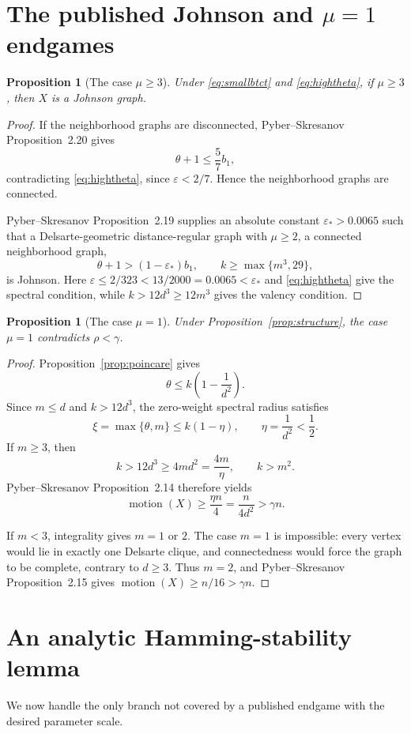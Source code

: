 \documentclass[11pt]{amsart}
\newtheorem{proposition}[theorem]{Proposition}
\theoremstyle{definition}
\newcommand{\mot}{\operatorname{motion}}
\newcommand{\eps}{\varepsilon}
\newcommand{\gam}{\gamma}
\begin{document}
\section{The published Johnson and $\mu=1$ endgames}
\begin{proposition}[The case $\mu\ge3$]\label{prop:mu3}
Under \eqref{eq:smallbtct} and \eqref{eq:hightheta}, if $\mu\ge3$, then $X$ is a Johnson graph.
\end{proposition}

\begin{proof}
If the neighborhood graphs are disconnected, Pyber--Skresanov Proposition~2.20 gives
\[
  \theta+1\le\frac57b_1,
\]
contradicting \eqref{eq:hightheta}, since $\eps<2/7$.  Hence the neighborhood graphs are connected.

Pyber--Skresanov Proposition~2.19 supplies an absolute constant $\eps_*>0.0065$ such that a Delsarte-geometric distance-regular graph with $\mu\ge2$, a connected neighborhood graph,
\[
  \theta+1>(1-\eps_*)b_1,
  \qquad
  k\ge\max\{m^3,29\},
\]
is Johnson.  Here $\eps\le2/323<13/2000=0.0065<\eps_*$ and \eqref{eq:hightheta} give the spectral condition, while $k>12d^3\ge12m^3$ gives the valency condition.
\end{proof}

\begin{proposition}[The case $\mu=1$]\label{prop:mu1}
Under Proposition~\ref{prop:structure}, the case $\mu=1$ contradicts $\rho<\gam$.
\end{proposition}

\begin{proof}
Proposition~\ref{prop:poincare} gives
\[
  \theta\le k\left(1-\frac1{d^2}\right).
\]
Since $m\le d$ and $k>12d^3$, the zero-weight spectral radius satisfies
\[
  \xi=\max\{\theta,m\}\le k(1-\eta),
  \qquad \eta=\frac1{d^2}<\frac12.
\]
If $m\ge3$, then
\[
  k>12d^3\ge4md^2=\frac{4m}{\eta},
  \qquad k>m^2.
\]
Pyber--Skresanov Proposition~2.14 therefore yields
\[
  \mot(X)\ge\frac{\eta n}{4}=\frac{n}{4d^2}>\gam n.
\]

If $m<3$, integrality gives $m=1$ or $2$.  The case $m=1$ is impossible: every vertex would lie in exactly one Delsarte clique, and connectedness would force the graph to be complete, contrary to $d\ge3$.  Thus $m=2$, and Pyber--Skresanov Proposition~2.15 gives $\mot(X)\ge n/16>\gam n$.
\end{proof}

\section{An analytic Hamming-stability lemma}\label{sec:mu2}
We now handle the only branch not covered by a published endgame with the desired parameter scale.
\end{document}
